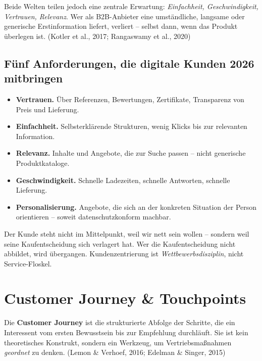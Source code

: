 \documentclass[11pt,a4paper,oneside]{article}
\newcommand{\fachbegriff}[1]{\textbf{#1}}
\newcommand{\quelle}[1]{{\footnotesize\color{lpGray}(#1)}}
\begin{document}
\medskip

\noindent Beide Welten teilen jedoch eine zentrale Erwartung: \emph{Einfachheit, Geschwindigkeit, Vertrauen, Relevanz}. Wer als B2B-Anbieter eine umständliche, langsame oder generische Erstinformation liefert, verliert -- selbst dann, wenn das Produkt überlegen ist. \quelle{Kotler et al., 2017; Rangaswamy et al., 2020}

\subsection{Fünf Anforderungen, die digitale Kunden 2026 mitbringen}

\begin{itemize}
  \item \textbf{Vertrauen.} Über Referenzen, Bewertungen, Zertifikate, Transparenz von Preis und Lieferung.
  \item \textbf{Einfachheit.} Selbsterklärende Strukturen, wenig Klicks bis zur relevanten Information.
  \item \textbf{Relevanz.} Inhalte und Angebote, die zur Suche passen -- nicht generische Produktkataloge.
  \item \textbf{Geschwindigkeit.} Schnelle Ladezeiten, schnelle Antworten, schnelle Lieferung.
  \item \textbf{Personalisierung.} Angebote, die sich an der konkreten Situation der Person orientieren -- soweit datenschutzkonform machbar.
\end{itemize}

\begin{merkbox}
Der Kunde steht nicht im Mittelpunkt, weil wir nett sein wollen -- sondern weil seine Kaufentscheidung sich verlagert hat. Wer die Kaufentscheidung nicht abbildet, wird übergangen. Kundenzentrierung ist \emph{Wettbewerbsdisziplin}, nicht Service-Floskel.
\end{merkbox}

\section{Customer Journey \& Touchpoints}

Die \fachbegriff{Customer Journey} ist die strukturierte Abfolge der Schritte, die ein Interessent vom ersten Bewusstsein bis zur Empfehlung durchläuft. Sie ist kein theoretisches Konstrukt, sondern ein Werkzeug, um Vertriebsmaßnahmen \emph{geordnet} zu denken. \quelle{Lemon \& Verhoef, 2016; Edelman \& Singer, 2015}
\end{document}
